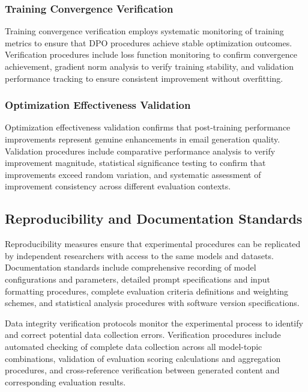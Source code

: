 \subsubsection{Training Convergence Verification}

Training convergence verification employs systematic monitoring of training metrics to ensure that DPO procedures achieve stable optimization outcomes. Verification procedures include loss function monitoring to confirm convergence achievement, gradient norm analysis to verify training stability, and validation performance tracking to ensure consistent improvement without overfitting.

\subsubsection{Optimization Effectiveness Validation}

Optimization effectiveness validation confirms that post-training performance improvements represent genuine enhancements in email generation quality. Validation procedures include comparative performance analysis to verify improvement magnitude, statistical significance testing to confirm that improvements exceed random variation, and systematic assessment of improvement consistency across different evaluation contexts.

\subsection{Reproducibility and Documentation Standards}

Reproducibility measures ensure that experimental procedures can be replicated by independent researchers with access to the same models and datasets. Documentation standards include comprehensive recording of model configurations and parameters, detailed prompt specifications and input formatting procedures, complete evaluation criteria definitions and weighting schemes, and statistical analysis procedures with software version specifications.

Data integrity verification protocols monitor the experimental process to identify and correct potential data collection errors. Verification procedures include automated checking of complete data collection across all model-topic combinations, validation of evaluation scoring calculations and aggregation procedures, and cross-reference verification between generated content and corresponding evaluation results.

